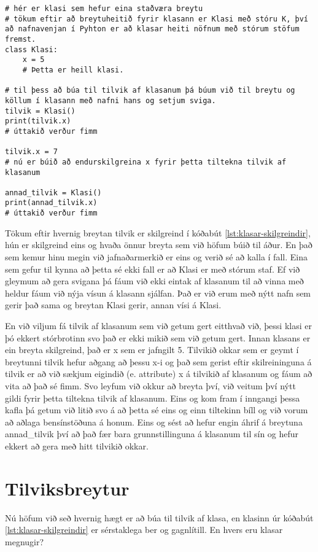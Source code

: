 \begin{lstlisting}[caption=Klasar skilgreindir, label=lst:klasar-skilgreindir]
# hér er klasi sem hefur eina staðværa breytu
# tökum eftir að breytuheitið fyrir klasann er Klasi með stóru K, því að nafnavenjan í Pyhton er að klasar heiti nöfnum með stórum stöfum fremst.
class Klasi:
	x = 5
	# Þetta er heill klasi.
	
# til þess að búa til tilvik af klasanum þá búum við til breytu og köllum í klasann með nafni hans og setjum sviga.
tilvik = Klasi()
print(tilvik.x)
# úttakið verður fimm

tilvik.x = 7
# nú er búið að endurskilgreina x fyrir þetta tiltekna tilvik af klasanum

annad_tilvik = Klasi()
print(annad_tilvik.x)
# úttakið verður fimm 
\end{lstlisting}

Tökum eftir hvernig breytan tilvik er skilgreind í kóðabút \ref{lst:klasar-skilgreindir}, hún er skilgreind eins og hvaða önnur breyta sem við höfum búið til áður.
En það sem kemur hinu megin við jafnaðarmerkið er eins og verið sé að kalla í fall.
Eina sem gefur til kynna að þetta sé ekki fall er að Klasi er með stórum staf.
Ef við gleymum að gera svigana þá fáum við ekki eintak af klasanum til að vinna með heldur fáum við nýja vísun á klasann sjálfan.
Það er við erum með nýtt nafn sem gerir það sama og breytan Klasi gerir, annan vísi á Klasi.

En við viljum fá tilvik af klasanum sem við getum gert eitthvað við, þessi klasi er þó ekkert stórbrotinn svo það er ekki mikið sem við getum gert.
Innan klasans er ein breyta skilgreind, það er x sem er jafngilt 5.
Tilvikið okkar sem er geymt í breytunni tilvik hefur aðgang að þessu x-i og það sem gerist eftir skilreininguna á tilvik er að við sækjum eigindið (e. attribute) x á tilvikið af klasanum og fáum að vita að það sé fimm.
Svo leyfum við okkur að breyta því, við veitum því nýtt gildi fyrir þetta tiltekna tilvik af klasanum.
Eins og kom fram í inngangi þessa kafla þá getum við litið svo á að þetta sé eins og einn tiltekinn bíll og við vorum að aðlaga bensínstöðuna á honum.
Eins og sést að hefur engin áhrif á breytuna annad\_tilvik því að það fær bara grunnstillinguna á klasanum til sín og hefur ekkert að gera með hitt tilvikið okkar.

\section{Tilviksbreytur}\label{uk:klasar-tilviksbreytur}
Nú höfum við seð hvernig hægt er að búa til tilvik af klasa, en klasinn úr kóðabút \ref{lst:klasar-skilgreindir} er sérstaklega ber og gagnlítill.
En hvers eru klasar megnugir?

